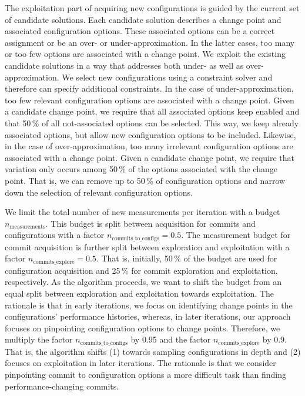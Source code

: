 \documentclass[sigconf, screen]{acmart}
\begin{document}
	The exploitation part of acquiring new configurations is guided by the current set of candidate solutions. Each candidate solution describes a change point and associated configuration options. These associated options can be a correct assignment or be an over- or under-approximation. In the latter cases, too many or too few options are associated with a change point. We exploit the existing candidate solutions in a way that addresses both under- as well as over-approximation. We select new configurations using a constraint solver and therefore can specify additional constraints. 
	In the case of under-approximation, too few relevant configuration options are associated with a change point. Given a candidate change point, we require that all associated options keep enabled and that 50\,\% of all not-associated options can be selected. This way, we keep already associated options, but allow new configuration options to be included. Likewise, in the case of over-approximation, too many irrelevant configuration options are associated with a change point. Given a candidate change point, we require that variation only occurs among 50\,\% of the options associated with the change point. That is, we can remove up to 50\,\% of configuration options and narrow down the selection of relevant configuration options.
	
	We limit the total number of new measurements per iteration with a budget $n_\text{measurements}$. This budget is split between acquisition for commits and configurations with a factor $n_\text{commits\_to\_configs} = 0.5$. The measurement budget for commit acquisition is further split between exploration and exploitation with a factor $n_\text{commits\_explore} = 0.5$. That is, initially, 50\,\% of the budget are used for configuration acquisition and 25\,\% for commit exploration and exploitation, respectively. 
	As the algorithm proceeds, we want to shift the budget from an equal split between exploration and exploitation towards exploitation. The rationale is that in early iterations, we focus on identifying change points in the configurations' performance histories, whereas, in later iterations, our approach focuses on pinpointing configuration options to change points. Therefore, we multiply the factor $n_\text{commits\_to\_configs}$ by 0.95 and the factor $n_\text{commits\_explore}$ by 0.9. That is, the algorithm shifts  (1) towards sampling configurations in depth and (2) focuses on exploitation in later iterations. The rationale is that we consider pinpointing commit to configuration options a more difficult task than finding performance-changing commits.
	
\end{document}
